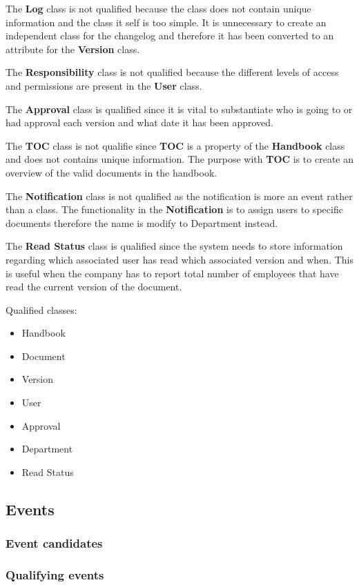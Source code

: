 The \textbf{Log} class is not qualified because the class does not contain unique information and the class it self is too simple. It is unnecessary to create an independent class for the changelog and therefore it has been converted to an attribute for the \textbf{Version} class.
 
The \textbf{Responsibility} class is not qualified because the different levels of access and permissions are present in the \textbf{User} class.

The \textbf{Approval} class is qualified since it is vital to substantiate who is going to or had approval each version and what date it has been approved. 

The \textbf{TOC} class is not qualifie since \textbf{TOC} is a property of the \textbf{Handbook} class and does not contains unique information. The purpose with \textbf{TOC} is to create an overview of the valid documents in the handbook.

The \textbf{Notification} class is not qualified as the notification is more an event rather than a class. The functionality in the \textbf{Notification} is to assign users to specific documents therefore the name is modify to Department instead.

The \textbf{Read Status} class is qualified since the system needs to store information regarding which associated user has read which associated version and when. This is useful when the company has to report total number of employees that have read the current version of the document.

Qualified classes:
\begin{itemize}
  \item Handbook
  \item Document
  \item Version
  \item User
  \item Approval
  \item Department
  \item Read Status
\end{itemize}

\subsection{Events}
\subsubsection{Event candidates}
\subsubsection{Qualifying events}

